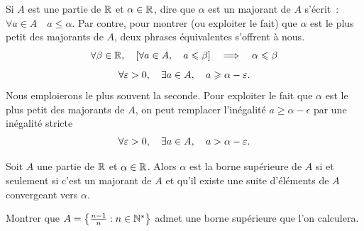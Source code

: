 \documentclass{magnoliaold}
\begin{document}
  \begin{remarques}
  \remarque Si $A$ est une partie de $\mathbb{R}$ et $\alpha\in\mathbb{R}$, dire que
    $\alpha$ est un majorant de $A$ s'écrit~: $\forall a\in A \quad a\leq \alpha$.
    Par contre, pour montrer (ou exploiter le fait) que $\alpha$ est le plus
    petit des majorants de $A$, deux phrases équivalentes s'offrent à nous.
    \[\forall \beta\in\mathbb{R} ,\quad \left[\forall a\in A ,\quad a\leqslant\beta\right]\quad\Longrightarrow\quad
           \alpha\leqslant\beta\]
    \[\forall \varepsilon>0 ,\quad \exists a\in A ,\quad a\geqslant \alpha-\varepsilon.\]
    Nous emploierons le plus souvent la seconde.
  \remarque Pour exploiter le fait que $\alpha$ est le plus petit des majorants de
    $A$, on peut remplacer l'inégalité $a\geq \alpha-\epsilon$ par une inégalité stricte
    \[\forall \varepsilon>0 ,\quad \exists a\in A ,\quad a> \alpha-\varepsilon.\]
  \end{remarques}

\begin{proposition}
Soit $A$ une partie de $\mathbb{R}$ et $\alpha\in\mathbb{R}$. Alors $\alpha$ est la borne supérieure
de $A$ si et seulement si c'est un majorant de $A$ et qu'il existe une suite
d'éléments de $A$ convergeant vers $\alpha$.
\end{proposition}  


\begin{exoUnique}
\exo Montrer que $A=\left\{\frac{n-1}{n} : n\in{\mathbb{N}^*}\right\}$ admet une borne
supérieure que l'on calculera.
\end{exoUnique}
\end{document}
